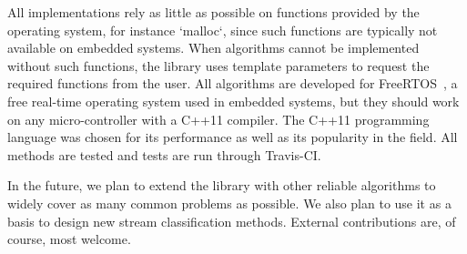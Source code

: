 \documentclass{article}
\begin{document}
All implementations rely as little as possible on functions provided by the 
operating system, for instance `malloc`, since such functions are typically
not available on embedded systems. When algorithms cannot be
implemented without such functions, the library uses template parameters to 
request the required functions from the user.  All algorithms are 
developed for FreeRTOS~\cite{freertos}, a free real-time operating 
system used in embedded systems, but they should work on any 
micro-controller with a C++11 compiler. The C++11 programming language 
was chosen for its performance as well as its popularity in the 
field. All methods are tested and tests are run through Travis-CI.

In the future, we plan to extend the library with other reliable 
algorithms to widely cover as many common problems as possible. We also plan to 
use it as a basis to design new stream classification methods.
External contributions are, of course, most welcome.




\end{document}
